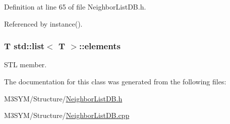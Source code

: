 Definition at line 65 of file Neighbor\+List\+D\+B.\+h.



Referenced by instance().

\hypertarget{classstd_1_1list_a682e5c7c91eb377d0cb4f019b2b81a5d}{
\subsubsection[{elements}]{\setlength{\rightskip}{0pt plus 5cm}T std\+::list$<$ T $>$\+::elements\hspace{0.3cm}{\ttfamily [inherited]}}}\label{classstd_1_1list_a682e5c7c91eb377d0cb4f019b2b81a5d}


S\+T\+L member. 



The documentation for this class was generated from the following files\+:\begin{DoxyCompactItemize}
\item 
M3\+S\+Y\+M/\+Structure/\hyperlink{NeighborListDB_8h}{Neighbor\+List\+D\+B.\+h}\item 
M3\+S\+Y\+M/\+Structure/\hyperlink{NeighborListDB_8cpp}{Neighbor\+List\+D\+B.\+cpp}\end{DoxyCompactItemize}
